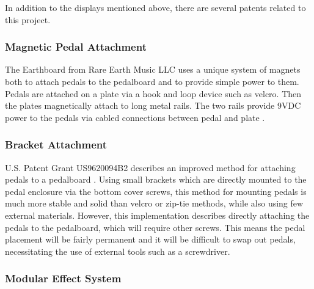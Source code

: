 \documentclass{article}
\begin{document}
	In addition to the displays mentioned above, there are several patents related to this project.

		\subsubsection{Magnetic Pedal Attachment}
		The Earthboard from Rare Earth Music LLC uses a unique system of magnets both to attach pedals to the pedalboard and to provide simple power to them.  Pedals are attached on a plate via a hook and loop device such as velcro.  Then the plates magnetically attach to long metal rails.  The two rails provide 9VDC power to the pedals via cabled connections between pedal and plate \cite{EARTHBOARDSITE}.

		\subsubsection{Bracket Attachment}

		U.S. Patent Grant US9620094B2 describes an improved method for attaching pedals to a pedalboard \cite{ABBATE:2016}.  Using small brackets which are directly mounted to the pedal enclosure via the bottom cover screws, this method for mounting pedals is much more stable and solid than velcro or zip-tie methods, while also using few external materials. However, this implementation describes directly attaching the pedals to the pedalboard, which will require other screws. This means the pedal placement will be fairly permanent and it will be difficult to swap out pedals, necessitating the use of external tools such as a screwdriver.

		\subsubsection{Modular Effect System}
\end{document}
